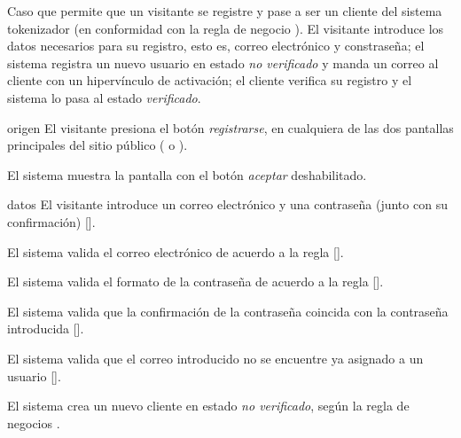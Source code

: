 %
%

{
  Caso que permite que un visitante se registre y pase a ser
  un cliente del sistema tokenizador (en conformidad con la regla de negocio
  ). El visitante introduce los datos
  necesarios para su registro, esto es, correo electrónico y constraseña; el
  sistema registra un nuevo usuario en estado \textit{no verificado} y manda un
  correo al cliente con un hipervínculo de activación; el cliente verifica su
  registro y el sistema lo pasa al estado \textit{verificado}.

  \begin{trayectoriaPrincipal}

    \item[origen] El visitante presiona el botón \textit{registrarse}, en
      cualquiera de las dos pantallas principales del sitio público
      ( o ).

    \item El sistema muestra la pantalla
       con el botón \textit{aceptar}
      deshabilitado.

    \item[datos] El visitante introduce un correo electrónico y una contraseña
      (junto con su confirmación) [].

    \item El sistema valida el correo electrónico de acuerdo a la regla
      [].

    \item El sistema valida el formato de la contraseña de acuerdo a la regla
      [].

    \item El sistema valida que la confirmación de la contraseña coincida con
      la contraseña introducida
      [].

    \item El sistema valida que el correo introducido no se encuentre ya asignado
      a un usuario [].

    \item El sistema crea un nuevo cliente en estado \textit{no verificado},
      según la regla de negocios .


\end{trayectoriaPrincipal}}
